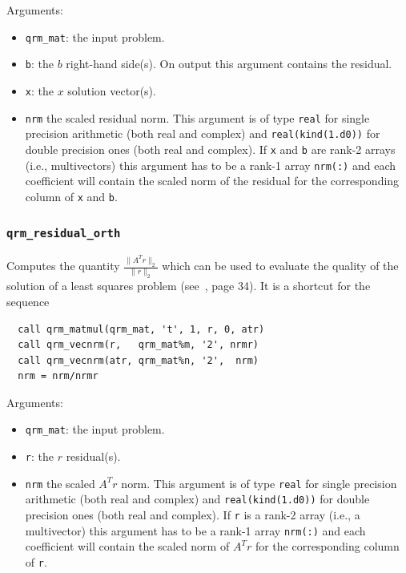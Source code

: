 \documentclass[11pt]{article}
\begin{document}

\noindent Arguments:
\begin{itemize}
\item \texttt{qrm\_mat}: the input problem.
\item \texttt{b}: the $b$ right-hand side(s). On output this argument
  contains the residual.
\item \texttt{x}: the $x$ solution vector(s).
\item \texttt{nrm} the scaled residual norm. This argument is of type
  \texttt{real} for single precision arithmetic (both real and
  complex) and \texttt{real(kind(1.d0))} for double precision ones
  (both real and complex). If \texttt{x} and \texttt{b} are rank-2
  arrays (i.e., multivectors) this argument has to be a rank-1 array
  \texttt{nrm(:)} and each coefficient will contain the scaled norm of
  the residual for the corresponding column of \texttt{x} and
  \texttt{b}.
\end{itemize}



\subsubsection{\texttt{qrm\_residual\_orth}}
Computes the quantity $\frac{\|A^Tr\|_2}{\|r\|_2}$ which can be used
to evaluate the quality of the solution of a least squares problem
(see~\cite{bjor:96}, page 34).
It is a shortcut for the sequence

\begin{lstlisting}
  call qrm_matmul(qrm_mat, 't', 1, r, 0, atr)
  call qrm_vecnrm(r,   qrm_mat%m, '2', nrmr)
  call qrm_vecnrm(atr, qrm_mat%n, '2',  nrm)
  nrm = nrm/nrmr
\end{lstlisting}
%

\noindent Arguments:
\begin{itemize}
\item \texttt{qrm\_mat}: the input problem.
\item \texttt{r}: the $r$ residual(s).
\item \texttt{nrm} the scaled $A^Tr$ norm. This argument is of type
  \texttt{real} for single precision arithmetic (both real and
  complex) and \texttt{real(kind(1.d0))} for double precision ones
  (both real and complex). If \texttt{r} is a rank-2 array
  (i.e., a multivector) this argument has to be a rank-1 array
  \texttt{nrm(:)} and each coefficient will contain the scaled norm of
  $A^Tr$ for the corresponding column of \texttt{r}.
\end{itemize}
\end{document}

